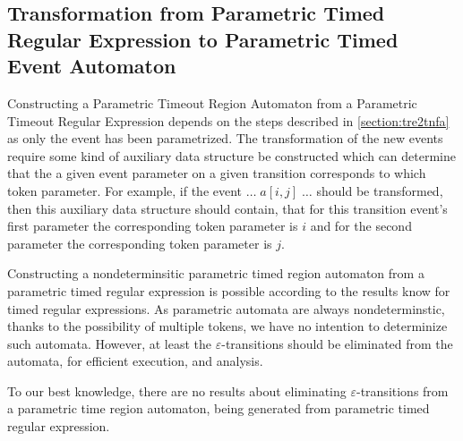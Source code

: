 		\subsection{Transformation from Parametric Timed Regular Expression to Parametric Timed Event Automaton}
		\label{section:ptre2tnfa}	
			
		Constructing a Parametric Timeout Region Automaton from a Parametric Timeout Regular Expression depends on the steps described in \cref{section:tre2tnfa} as only the event has been parametrized. The transformation of the new events require some kind of auxiliary data structure be constructed which can determine that the a given event parameter on a given transition corresponds to which token parameter. For example, if the event $\dots \; a[i,j] \; \dots$ should be transformed, then this auxiliary data structure should contain, that for this transition event's first parameter the corresponding token parameter is $i$ and for the second parameter the corresponding token parameter is $j$. 
		
	
		Constructing a nondeterminsitic parametric timed region automaton from a parametric timed regular expression is possible according to the results know for timed regular expressions. As parametric automata are always nondeterminstic, thanks to the possibility of multiple tokens, we have no intention to determinize such automata.
		However, at least the $\varepsilon$-transitions should be eliminated from the automata, for efficient execution, and analysis.
		
		To our best knowledge, there are no results about eliminating $\varepsilon$-transitions from a parametric time region automaton, being generated from parametric timed regular expression.
		
